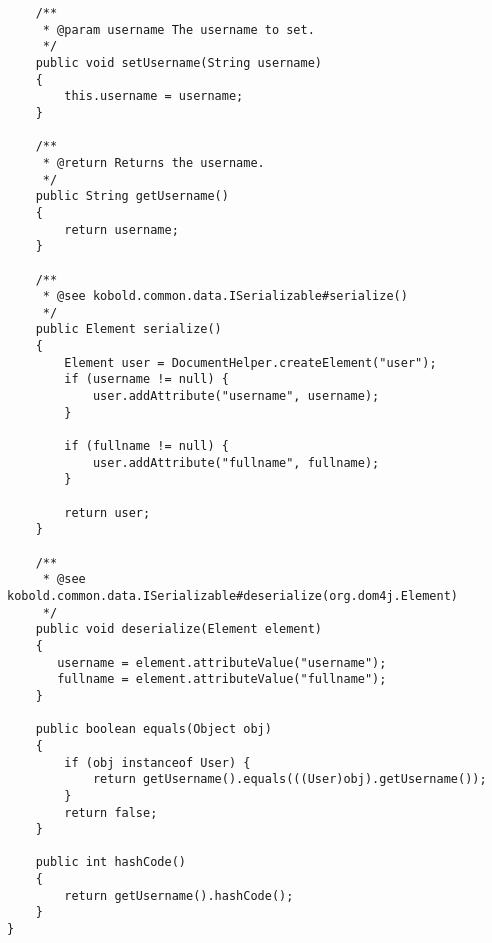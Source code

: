 \begin{verbatim}
    /**
     * @param username The username to set.
     */
    public void setUsername(String username)
    {
        this.username = username;
    }
    
    /**
     * @return Returns the username.
     */
    public String getUsername()
    {
        return username;
    }

    /**
     * @see kobold.common.data.ISerializable#serialize()
     */
    public Element serialize()
    {
        Element user = DocumentHelper.createElement("user");
        if (username != null) {
            user.addAttribute("username", username);   
        }
        
        if (fullname != null) {
            user.addAttribute("fullname", fullname);
        }
        
        return user;
    }

    /**
     * @see kobold.common.data.ISerializable#deserialize(org.dom4j.Element)
     */
    public void deserialize(Element element)
    {
       username = element.attributeValue("username");
       fullname = element.attributeValue("fullname");
    }
    
    public boolean equals(Object obj)
    {
        if (obj instanceof User) {
            return getUsername().equals(((User)obj).getUsername());
        }
        return false;
    }
    
    public int hashCode()
    {
        return getUsername().hashCode();
    }
}

\end{verbatim}
